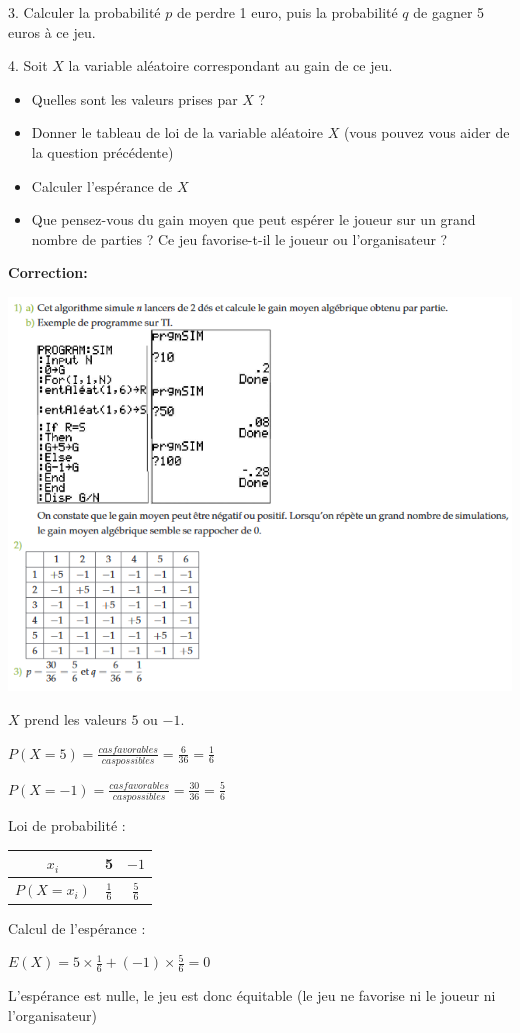 \documentclass[11pt]{cornouaille}
\begin{document}
3.   Calculer la probabilit\'{e} $p$ de perdre 1 euro, puis
la probabilit\'{e} $q$ de gagner 5 euros \`{a} ce jeu.



4.  Soit $X$ la variable aléatoire correspondant au gain de ce jeu.

\begin{itemize}
\item Quelles sont les valeurs prises par $X$ ?
\item Donner le tableau de loi de la variable aléatoire $X$ (vous pouvez vous aider de la question précédente)
\item Calculer l'espérance de $X$
\item Que pensez-vous du gain moyen que peut esp\'{e}rer le
joueur sur un grand nombre de parties ? Ce jeu favorise-t-il le
joueur ou l'organisateur ?
\end{itemize}






\bigskip

{\color{red}

\textbf{Correction:}



\includegraphics[scale=0.9]{algo1.png}


$X$ prend les valeurs $5$ ou $-1$.

$P(X=5)=\frac{cas favorables}{cas possibles}=\frac{6}{36}=\frac{1}{6}$

$P(X=-1)=\frac{cas favorables}{cas possibles}=\frac{30}{36}=\frac{5}{6}$


Loi de probabilité :




\begin{tabular}{|c|c|c|}
\hline
$x_i$ & 5 & $-1$ \\
\hline
$P(X=x_i)$ & $\frac{1}{6}$ & $\frac{5}{6}$ \\
\hline

\end{tabular}



Calcul de l'espérance :

$E(X)=5 \times \frac{1}{6}+(-1) \times \frac{5}{6}=0$

L'espérance est nulle, le jeu est donc équitable (le jeu ne favorise ni le joueur ni l'organisateur)
}
\end{document}
